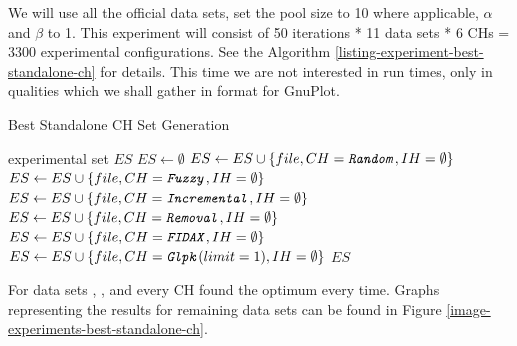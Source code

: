 We will use all the official data sets, set the pool size to 10 where applicable, $\alpha$ and $\beta$ to 1. This experiment will consist of 50 iterations * 11 data sets * 6 CHs = 3300 experimental configurations. See the Algorithm \ref{listing-experiment-best-standalone-ch} for details. This time we are not interested in run times, only in qualities which we shall gather in format for GnuPlot.\\

\begin{algorithm}
\caption{Best Standalone CH Set Generation}
\label{listing-experiment-best-standalone-ch}
\begin{algorithmic}
\ENSURE experimental set $ES$
\STATE $ES \gets \emptyset$
    	\STATE $ES \gets ES \cup \{file, CH = \texttt{\textit{Random}}, IH = \emptyset\}$
    	\STATE $ES \gets ES \cup \{file, CH = \texttt{\textit{Fuzzy}}, IH = \emptyset\}$
    	\STATE $ES \gets ES \cup \{file, CH = \texttt{\textit{Incremental}}, IH = \emptyset\}$
    	\STATE $ES \gets ES \cup \{file, CH = \texttt{\textit{Removal}}, IH = \emptyset\}$
    	\STATE $ES \gets ES \cup \{file, CH = \texttt{\textit{FIDAX}}, IH = \emptyset\}$
    	\STATE $ES \gets ES \cup \{file, CH = \texttt{\textit{Glpk}}(limit = 1), IH = \emptyset\}$
  \ENDFOR
\ENDFOR
\RETURN $ES$
\end{algorithmic}
\end{algorithm}

For data sets , ,  and  every CH found the optimum every time. Graphs representing the results for remaining data sets can be found in Figure \ref{image-experiments-best-standalone-ch}.

